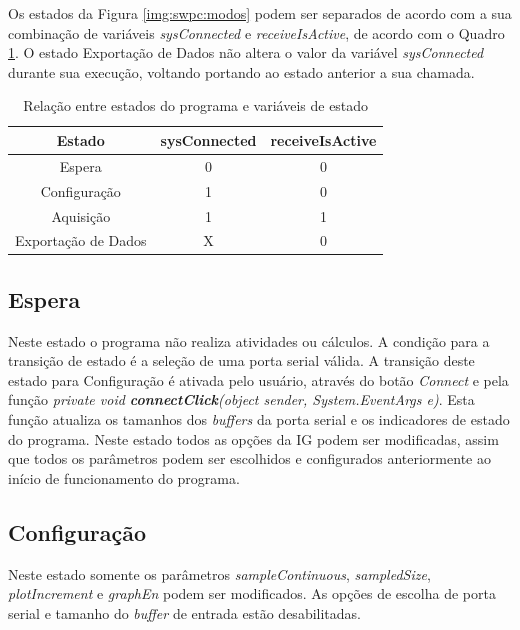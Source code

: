 			Os estados da Figura \ref{img:swpc:modos} podem ser separados de acordo com a sua combinação de variáveis \textit{sysConnected} e \textit{receiveIsActive}, de acordo com o Quadro \ref{tab:swpc:stateschange}. O estado Exportação de Dados não altera o valor da variável \textit{sysConnected} durante sua execução, voltando portando ao estado anterior a sua chamada.


			\begin{table}
				\caption{Relação entre estados do programa e variáveis de estado}
				\label{tab:swpc:stateschange}
				\centering
				\begin{tabular}{|c|c|c|}
					\hline
					\textbf{Estado}	&	\textbf{sysConnected}	&	\textbf{receiveIsActive}		\\ 	\hline
					Espera			&	0						&	0								\\	\hline
					Configuração	&	1						&	0								\\	\hline
					Aquisição		&	1						&	1								\\	\hline
					Exportação de Dados	&	X					&	0								\\ 	\hline
				\end{tabular}
			\end{table}


		\subsection{Espera}\label{sec:swpc:wait}

			Neste estado o programa não realiza atividades ou cálculos. A condição para a transição de estado é a seleção de uma porta serial válida. A transição deste estado para Configuração é ativada pelo usuário, através do botão \textit{Connect} e pela função \textit{private void \textbf{connectClick}(object sender, System.EventArgs e)}. Esta função atualiza os tamanhos dos \textit{buffers} da porta serial e os indicadores de estado do programa. Neste estado todos as opções da IG podem ser modificadas, assim que todos os parâmetros podem ser escolhidos e configurados anteriormente ao início de funcionamento do programa.

		\subsection{Configuração}\label{sec:swpc:config}

			Neste estado somente os parâmetros \textit{sampleContinuous}, \textit{sampledSize}, \textit{plotIncrement} e \textit{graphEn} podem ser modificados. As opções de escolha de porta serial e tamanho do \textit{buffer} de entrada estão desabilitadas.

